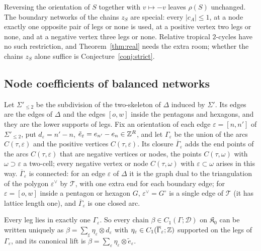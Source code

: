 Reversing the orientation of $S$ together with $v\mapsto-v$ leaves $\rho(S)$ unchanged. The boundary networks of the
chains $z_S$ are special: every $|c_A|\le1$, at a node exactly one opposite pair of legs or none is used, at a positive
vertex two legs or none, and at a negative vertex three legs or none. Relative tropical $2$-cycles have no such
restriction, and Theorem~\ref{thm:real} needs the extra room; whether the chains $z_S$ alone suffice is
Conjecture~\ref{conj:strict}.

\subsection{Node coefficients of balanced networks}\label{ssec:cycles-bdry}

Let $\Sigma'_{\le2}$ be the subdivision of the two-skeleton of $\Delta$ induced by $\Sigma'$. Its edges are the edges of
$\Delta$ and the edges $[o,w]$ inside the pentagons and hexagons, and they are the lower supports of legs. Fix an
orientation of each edge $\varepsilon=[n,n']$ of $\Sigma'_{\le2}$, put $d_\varepsilon=n'-n$, $\tilde e_\varepsilon=e_{n'}-e_n\in\mathbb Z^R$, and let
$\Gamma_\varepsilon$ be the union of the arcs $C(\tau,\varepsilon)$ and the positive vertices $C(\tau,\varepsilon)$. Its
closure $\overline\Gamma_\varepsilon$ adds the end points of the arcs $C(\tau,\varepsilon)$ that are negative vertices or
nodes, the points $C(\tau,\omega)$ with $\omega\supset\varepsilon$ a two-cell; every negative vertex or node $C(\tau,\omega)$
with $\varepsilon\subset\omega$ arises in this way.
$\overline\Gamma_\varepsilon$ is connected: for an edge $\varepsilon$ of $\Delta$ it is the graph dual to the
triangulation of the polygon $\varepsilon^\vee$ by $\mathcal T$, with one extra end for each boundary edge; for
$\varepsilon=[o,w]$ inside a pentagon or hexagon $G$, $\varepsilon^\vee=G^\circ$ is a single edge of $\mathcal T$ (it has
lattice length one), and $\overline\Gamma_\varepsilon$ is one closed arc.

Every leg lies in exactly one $\Gamma_\varepsilon$. So every chain $\beta\in C_1(\Gamma;\mathcal D)$ on $\mathfrak K_0$ can be
written uniquely as $\beta=\sum_\varepsilon\eta_\varepsilon\otimes d_\varepsilon$ with $\eta_\varepsilon\in
C_1(\overline\Gamma_\varepsilon;\mathbb Z)$ supported on the legs of $\Gamma_\varepsilon$, and its canonical lift is
$\tilde\beta=\sum_\varepsilon\eta_\varepsilon\otimes\tilde e_\varepsilon$.

